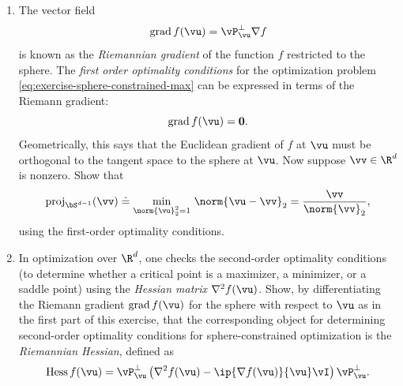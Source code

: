 \documentclass[../../book-main.tex]{subfiles}
\begin{document}
\begin{exercise}
\begin{enumerate}
            $\vP_{\vu}^\perp = \vI - \vu\vu^\top$.
        \item The vector field
            \begin{equation}\label{eq:exercise-riemann-grad-sphere}
                \mathrm{grad}\, f(\vu) = \vP_{\vu}^\perp \nabla f
            \end{equation}
            is known as the \textit{Riemannian gradient} of the
            function $f$ restricted to the sphere.
            The \textit{first order optimality conditions} for the
            optimization problem
            \eqref{eq:exercise-sphere-constrained-max} can be
            expressed in terms of the Riemann gradient:
            \begin{equation*}
                \mathrm{grad}\, f(\vu) = \mathbf{0}.
            \end{equation*}
            Geometrically, this says that the Euclidean gradient of
            $f$ at $\vu$ must be orthogonal to the tangent space to
            the sphere at $\vu$.
            Now suppose $\vv \in \R^d$ is nonzero. Show that
            \begin{equation*}
                \mathrm{proj}_{\bS^{d-1}}(\vv) \doteq
                \min_{\norm{\vu}_2^2 = 1}\, \norm{\vu - \vv}_2
                =
                \frac{\vv}{\norm{\vv}_2},
            \end{equation*}
            using the first-order optimality conditions.
        \item In optimization over $\R^d$, one checks the
            second-order optimality conditions (to determine whether
                a critical point is a maximizer, a minimizer, or a saddle
            point) using the \textit{Hessian matrix} $\nabla^2 f(\vu)$.
            Show, by differentiating the Riemann gradient
            $\mathrm{grad}\, f(\vu)$ for the sphere with respect to
            $\vu$ as in the first part of this exercise, that the
            corresponding object for determining second-order
            optimality conditions for sphere-constrained optimization
            is the \textit{Riemannian Hessian}, defined as
            \begin{equation}\label{eq:exercise-riemann-hess-sphere}
                \mathrm{Hess}\, f(\vu) = \vP_{\vu}^\perp \left(
                    \nabla^2 f(\vu) - \ip{\nabla f(\vu)}{\vu} \vI
                \right) \vP_{\vu}^\perp.
            \end{equation}
    \end{enumerate}
\end{exercise}
\end{document}

